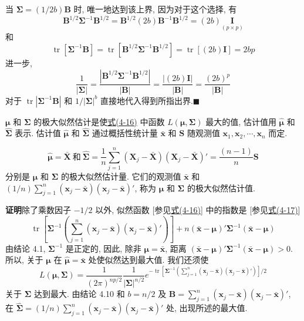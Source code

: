 当 $\boldsymbol{\Sigma}=(1/2b)\mathbf{B}$ 时, 唯一地达到该上界, 因为对于这个选择, 有
\[
\mathbf{B}^{1/2}\boldsymbol{\Sigma}^{-1}\mathbf{B}^{1/2}=\mathbf{B}^{1/2}(2b)\mathbf{B}^{-1}\mathbf{B}^{1/2}=(2b)\underset{(p\times p)}{\mathbf{I}}
\]
和
\[
\operatorname{tr}[\boldsymbol{\Sigma}^{-1}\mathbf{B}]=\operatorname{tr}[\mathbf{B}^{1/2}\boldsymbol{\Sigma}^{-1}\mathbf{B}^{1/2}]=\operatorname{tr}[(2b)\mathbf{I}]=2bp
\]
进一步,
\[
\frac{1}{|\boldsymbol{\Sigma}|}=\frac{|\mathbf{B}^{1/2}\boldsymbol{\Sigma}^{-1}\mathbf{B}^{1/2}|}{|\mathbf{B}|}=\frac{|(2b)\mathbf{I}|}{|\mathbf{B}|}=\frac{(2b)^{p}}{|\mathbf{B}|}
\]
对于 $\operatorname{tr}|\boldsymbol{\Sigma}^{-1}\mathbf{B}|$ 和 $1/|\boldsymbol{\Sigma}|^{b}$ 直接地代入得到所指出界.\hfill$\blacksquare$

$\boldsymbol{\mu}$ 和 $\boldsymbol{\Sigma}$ 的极大似然估计是使\hyperref[eq:4-16]{式(4-16)} 中函数 $L(\boldsymbol{\mu},\boldsymbol{\Sigma})$ 最大的值, 估计值用 $\hat{\boldsymbol{\mu}}$ 和 $\hat{\boldsymbol{\Sigma}}$ 表示. 估计值 $\hat{\boldsymbol{\mu}}$ 和 $\hat{\boldsymbol{\Sigma}}$ 通过概括性统计量 $\bar{\mathbf{x}}$ 和 $\mathbf{S}$ 随观测值 $\mathbf{x}_{1},\mathbf{x}_{2},\cdots,\mathbf{x}_{n}$ 而定.

\[
\hat{\boldsymbol{\mu}}=\bar{\mathbf{X}}\ \text{和}\ \hat{\boldsymbol{\Sigma}}=\frac{1}{n}\sum_{j=1}^{n}(\mathbf{X}_{j}-\bar{\mathbf{X}})(\mathbf{X}_{j}-\bar{\mathbf{X}})'=\frac{(n-1)}{n}\mathbf{S}
\]
分别是 $\boldsymbol{\mu}$ 和 $\boldsymbol{\Sigma}$ 的极大似然估计量. 它们的观测值 $\bar{\mathbf{x}}$ 和 $(1/n)\sum_{j=1}^{n}(\mathbf{x}_{j}-\bar{\mathbf{x}})(\mathbf{x}_{j}-\bar{\mathbf{x}})'$, 称为 $\boldsymbol{\mu}$ 和 $\boldsymbol{\Sigma}$ 的极大似然估计值.

\noindent\textbf{证明}\quad 除了乘数因子 $-1/2$ 以外, 似然函数 [参见\hyperref[eq:4-16]{式(4-16)}] 中的指数是 [参见\hyperref[eq:4-17]{式(4-17)}]
\[
\operatorname{tr}\left[\boldsymbol{\Sigma}^{-1}\left(\sum_{j=1}^{n}(\mathbf{x}_{j}-\bar{\mathbf{x}})(\mathbf{x}_{j}-\bar{\mathbf{x}})'\right)\right]+n(\bar{\mathbf{x}}-\boldsymbol{\mu})'\boldsymbol{\Sigma}^{-1}(\bar{\mathbf{x}}-\boldsymbol{\mu})
\]
由结论 4.1, $\boldsymbol{\Sigma}^{-1}$ 是正定的, 因此, 除非 $\boldsymbol{\mu}=\bar{\mathbf{x}}$, 距离 $(\bar{\mathbf{x}}-\boldsymbol{\mu})'\boldsymbol{\Sigma}^{-1}(\bar{\mathbf{x}}-\boldsymbol{\mu})>0$. 所以, 关于 $\boldsymbol{\mu}$ 在 $\hat{\boldsymbol{\mu}}=\bar{\mathbf{x}}$ 处使似然达到最大值. 我们还须使
\[
L(\boldsymbol{\mu},\boldsymbol{\Sigma})=\frac{1}{(2\pi)^{np/2}}\frac{1}{|\boldsymbol{\Sigma}|^{n/2}}e^{-\operatorname{tr}\left[\boldsymbol{\Sigma}^{-1}\left(\sum_{j=1}^{n}(\mathbf{x}_{j}-\bar{\mathbf{x}})(\mathbf{x}_{j}-\bar{\mathbf{x}})'\right)\right]/2}
\]
关于 $\boldsymbol{\Sigma}$ 达到最大. 由结论 4.10 和 $b=n/2$ 及 $\mathbf{B}=\sum_{j=1}^{n}(\mathbf{x}_{j}-\bar{\mathbf{x}})(\mathbf{x}_{j}-\bar{\mathbf{x}})'$, 在 $\hat{\boldsymbol{\Sigma}}=(1/n)\sum_{j=1}^{n}(\mathbf{x}_{j}-\bar{\mathbf{x}})(\mathbf{x}_{j}-\bar{\mathbf{x}})'$ 处, 出现所述的最大值.

